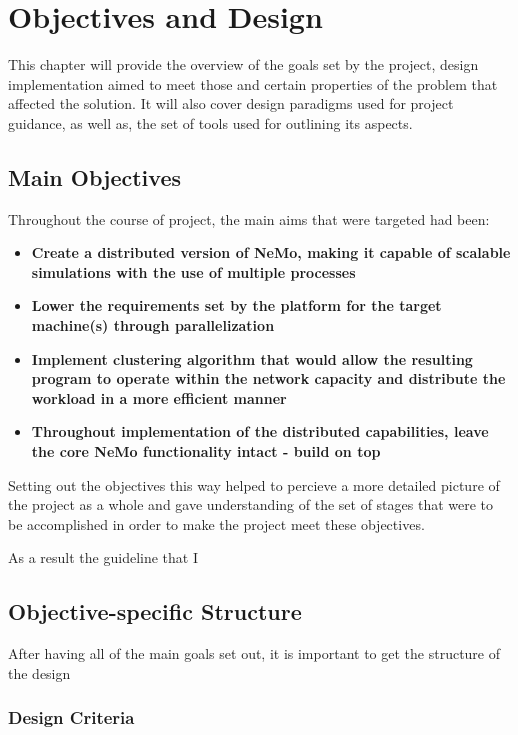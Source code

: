 \chapter{Objectives and Design}

This chapter will provide the overview of the goals set by the project, design implementation aimed to meet those and certain properties of the problem that affected the solution.
It will also cover design paradigms used for project guidance, as well as, the set of tools used for outlining its aspects.

\section{Main Objectives}

Throughout the course of project, the main aims that were targeted had been:

\begin{itemize}
\item {\textbf{Create a distributed version of NeMo, making it capable of scalable simulations with the use of multiple processes}}
\item {\textbf{Lower the requirements set by the platform for the target machine(s) through parallelization}}
\item {\textbf{Implement clustering algorithm that would allow the resulting program to operate within the network capacity and distribute the workload in a more efficient manner}}
\item {\textbf{Throughout implementation of the distributed capabilities, leave the core NeMo functionality intact - build on top}}
\end{itemize}

Setting out the objectives this way helped to percieve a more detailed picture of the project as a whole and gave understanding of the set of stages that were to be accomplished in order to
make the project meet these objectives. 

As a result the guideline that I 

\section{Objective-specific Structure}

After having all of the main goals set out, it is important to get the structure of the design 

\subsection{Design Criteria}


